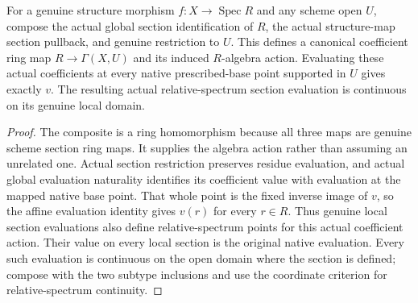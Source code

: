 \begin{theorem}
\label{scheme:relative-section-coefficients}
\leanok
{}
For a genuine structure morphism $f:X\to\operatorname{Spec}R$ and any
scheme open $U$, compose the actual global section identification of $R$,
the actual structure-map section pullback, and genuine restriction to $U$.
This defines a canonical coefficient ring map $R\to\Gamma(X,U)$ and its
induced $R$-algebra action. Evaluating these actual coefficients at every
native prescribed-base point supported in $U$ gives exactly $v$. The
resulting actual relative-spectrum section evaluation is continuous on
its genuine local domain.
\end{theorem}
\begin{proof}
The composite is a ring homomorphism because all three maps are genuine
scheme section ring maps. It supplies the algebra action rather than assuming
an unrelated one. Actual section restriction preserves residue evaluation,
and actual global evaluation naturality identifies its coefficient value
with evaluation at the mapped native base point. That whole point is the
fixed inverse image of $v$, so the affine evaluation identity gives $v(r)$
for every $r\in R$. Thus genuine local section evaluations also define
relative-spectrum points for this actual coefficient action. Their value
on every local section is the original native evaluation. Every such
evaluation is continuous on the open domain where the section is defined;
compose with the two subtype inclusions and use the coordinate criterion
for relative-spectrum continuity.
\end{proof}
